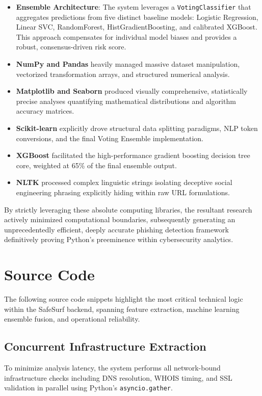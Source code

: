 \begin{itemize}
\item \textbf{Ensemble Architecture}: The system leverages a \texttt{VotingClassifier} that aggregates predictions from five distinct baseline models: Logistic Regression, Linear SVC, RandomForest, HistGradientBoosting, and calibrated XGBoost. This approach compensates for individual model biases and provides a robust, consensus-driven risk score.
\item \textbf{NumPy and Pandas} heavily managed massive dataset manipulation, vectorized transformation arrays, and structured numerical analysis.
\item \textbf{Matplotlib and Seaborn} produced visually comprehensive, statistically precise analyses quantifying mathematical distributions and algorithm accuracy matrices.
\item \textbf{Scikit-learn} explicitly drove structural data splitting paradigms, NLP token conversions, and the final Voting Ensemble implementation.
\item \textbf{XGBoost} facilitated the high-performance gradient boosting decision tree core, weighted at 65\% of the final ensemble output.
\item \textbf{NLTK} processed complex linguistic strings isolating deceptive social engineering phrasing explicitly hiding within raw URL formulations.
\end{itemize}
\noindent
By strictly leveraging these absolute computing libraries, the resultant research actively minimized computational boundaries, subsequently generating an unprecedentedly efficient, deeply accurate phishing detection framework definitively proving Python's preeminence within cybersecurity analytics.

\newpage

\section{Source Code}

The following source code snippets highlight the most critical technical logic within the SafeSurf backend, spanning feature extraction, machine learning ensemble fusion, and operational reliability.

\subsection{Concurrent Infrastructure Extraction}
\noindent
To minimize analysis latency, the system performs all network-bound infrastructure checks including DNS resolution, WHOIS timing, and SSL validation in parallel using Python's \texttt{asyncio.gather}.

